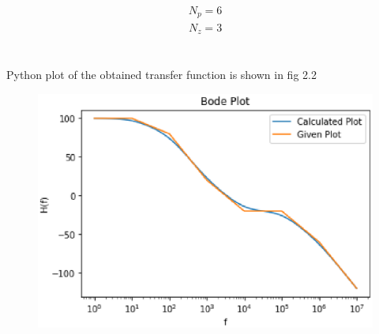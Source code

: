 \begin{enumerate}[label=\thesection.\arabic*.,ref=\thesection.\theenumi]
\begin{align}
	N_{p} = 6  
\end{align}
\begin{align}
	N_{z} = 3
\end{align}
\\ \\
Python plot of the obtained transfer function is shown in fig 2.2
\begin{figure}[htp]
    \centering
    \includegraphics[width=\columnwidth]{./figs/ee18btech11001_2.eps}
    \caption{}
    \label{fig:bode}
\end{figure}
\end{enumerate}